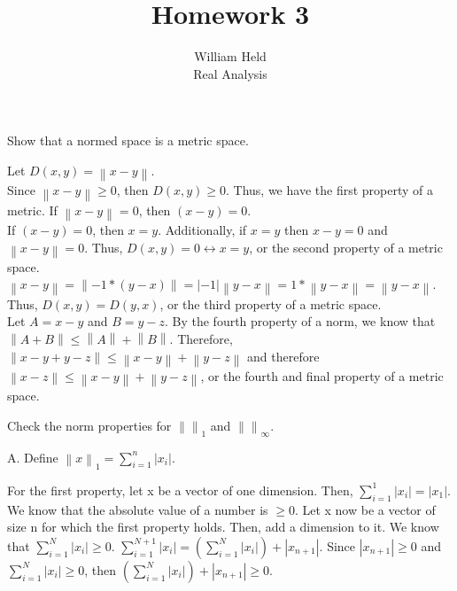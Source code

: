 \documentclass[12pt]{article}
\newenvironment{exercise}[2][Exercise]{\begin{trivlist}
\item[\hskip \labelsep {\bfseries #1}\hskip \labelsep {\bfseries #2.}]}{\end{trivlist}}
\begin{document}
 
 
 
\title{Homework 3}%
\author{William Held\\ %
Real Analysis} %

\newcommand{\norm}[1]{\left\lVert#1\right\rVert}
\newcommand{\abs}[1]{|#1|}
\let\biconditional\leftrightarrow
\maketitle
\begin{exercise}{1.1}
Show that a normed space is a metric space.
\end{exercise}
Let $D(x,y) = \norm{x-y}$. \\

Since $\norm{x-y} \geq 0$, then $D(x,y) \geq 0$. Thus, we have the first property of a metric. If $\norm{x-y} = 0$, then $(x - y) = 0$. \\ 

If $(x - y) = 0$, then $x=y$. Additionally, if $x=y$ then $x-y = 0$ and $\norm{x-y} = 0$. Thus, $D(x,y) = 0 \biconditional x=y$, or the second property of a metric space. \\ 

$\norm{x-y} = \norm{-1*(y-x)} = \abs{-1}\norm{y-x} = 1*\norm{y-x} = \norm{y-x}$. Thus, $D(x,y) = D(y,x)$, or the third property of a metric space. \\

Let $A = x-y$ and $B = y-z$. By the fourth property of a norm, we know that $\norm{A+B} \leq \norm{A}+\norm{B}$. Therefore, $\norm{x-y+y-z} \leq \norm{x-y}+\norm{y-z}$ and therefore $\norm{x-z} \leq \norm{x-y}+\norm{y-z}$, or the fourth and final property of a metric space.


\begin{exercise}{1.2}
Check the norm properties for $\norm{ }_{1}$ and $\norm{}_{\infty}$.
\end{exercise}
A.
Define $\norm{x}_{1} = \sum_{i=1}^{n} \abs{x_i} $. 

For the first property, let x be a vector of one dimension. Then, $\sum_{i=1}^{1} \abs{x_i} = \abs{x_1}$. We know that the absolute value of a number is $\geq 0$. Let x now be a vector of size n for which the first property holds. Then, add a dimension to it. We know that $\sum_{i=1}^{N} \abs{x_i} \geq 0$. $\sum_{i=1}^{N+1} \abs{x_i} = (\sum_{i=1}^{N} \abs{x_i}) + \abs{x_{n+1}}$. Since $\abs{x_{n+1}} \geq 0$ and $\sum_{i=1}^{N} \abs{x_i} \geq 0$, then $(\sum_{i=1}^{N} \abs{x_i}) + \abs{x_{n+1}} \geq 0$. \\
\end{document}
